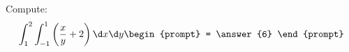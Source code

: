 \documentclass{ximera}
\author{Gregory Hartman \and Bart Snapp}
\begin{document}
\begin{exercise}
  Compute:
  \[
  \int_1^2 \int_{-1}^1 \left(\frac{x}{y}+2\right)\d x \d y
  \begin{prompt}
   = \answer{6}
  \end{prompt}
  \]
\end{exercise}
\end{document}
